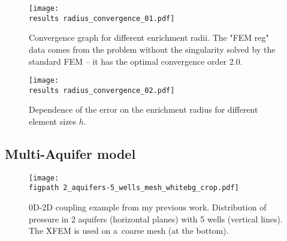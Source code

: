 \begin{figure}[!htb]
  \centering    
  \texttt{[image: \\results radius\_convergence\_01.pdf]}
  \caption[Convergence for different enrichment radii.]{Convergence graph for different enrichment radii. The "FEM reg"
  data comes from the problem without the singularity solved by the standard FEM -- it has the optimal convergence order 2.0.}
  \label{fig:radius_conv_1}
\end{figure}
\begin{figure}[!htb]
  \centering    
  \texttt{[image: \\results radius\_convergence\_02.pdf]}
  \caption[Optimal enrichment radius.]{Dependence of the error on the enrichment radius for different
  element sizes $h$.}
  \label{fig:radius_conv_2}
\end{figure}


\subsection{Multi-Aquifer model}
%     

\begin{figure}[!htb]
  \centering    
    \texttt{[image: \\figpath 2\_aquifers-5\_wells\_mesh\_whitebg\_crop.pdf]}
  \caption{0D-2D coupling example from my previous work. Distribution of pressure in 2 aquifers (horizontal planes) with 5 wells 
          (vertical lines). The XFEM is used on a~coarse mesh (at the bottom). }
  \label{fig:aquifers}
\end{figure}

